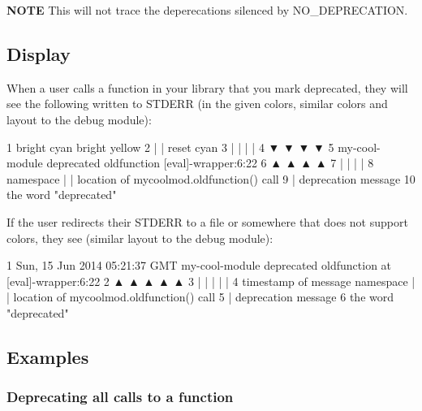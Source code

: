 {\bfseries N\+O\+T\+E} This will not trace the deperecations silenced by {\ttfamily N\+O\+\_\+\+D\+E\+P\+R\+E\+C\+A\+T\+I\+O\+N}.

\subsection*{Display}



When a user calls a function in your library that you mark deprecated, they will see the following written to S\+T\+D\+E\+R\+R (in the given colors, similar colors and layout to the {\ttfamily debug} module)\+:


\begin{DoxyCode}
1 bright cyan    bright yellow
2 |              |          reset       cyan
3 |              |          |           |
4 ▼              ▼          ▼           ▼
5 my-cool-module deprecated oldfunction [eval]-wrapper:6:22
6 ▲              ▲          ▲           ▲
7 |              |          |           |
8 namespace      |          |           location of mycoolmod.oldfunction() call
9                |          deprecation message
10                the word "deprecated"
\end{DoxyCode}


If the user redirects their S\+T\+D\+E\+R\+R to a file or somewhere that does not support colors, they see (similar layout to the {\ttfamily debug} module)\+:


\begin{DoxyCode}
1 Sun, 15 Jun 2014 05:21:37 GMT my-cool-module deprecated oldfunction at [eval]-wrapper:6:22
2 ▲                             ▲              ▲          ▲              ▲
3 |                             |              |          |              |
4 timestamp of message          namespace      |          |             location of mycoolmod.oldfunction()
       call
5                                              |          deprecation message
6                                              the word "deprecated"
\end{DoxyCode}


\subsection*{Examples}

\subsubsection*{Deprecating all calls to a function}

